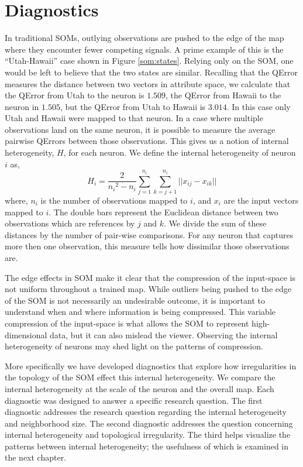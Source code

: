 \section{Diagnostics}
\label{meth:diag}
In traditional SOMs, outlying observations are pushed to the edge of the map
where they encounter fewer competing signals.  A prime example of this is the
``Utah-Hawaii'' case shown in Figure \ref{som:states}.  Relying only on the
SOM, one would be left to believe that the two states are similar.  Recalling
that the QError measures the distance between two vectors in attribute space,
we calculate that the QError from Utah to the neuron is $1.509$, the QError from
Hawaii to the neuron in $1.505$, but the QError from Utah to Hawaii is
$3.014$. In this case only Utah and Hawaii were mapped to that neuron.  In a
case where multiple observations land on the same neuron, it is possible to
measure the average pairwise QErrors between those observations.  This gives us a
notion of internal heterogeneity, \(H\), for each neuron.  We define the
internal heterogeneity of neuron \(i\) as,
 \begin{equation}
   {H_i} = \frac{2}{{n_i}^2-{n_i}}\sum_{j=1}^{n_i}\sum_{k=j+1}^{n_i} ||{x_{ij}}-{x_{ik}}||
 \label{eqno1}
 \end{equation}
where, \(n_i\) is the number of observations mapped to \(i\), and \(x_i\) are
the input vectors mapped to \(i\).   The double bars represent the Euclidean
distance between two observations which are references by \(j\) and \(k\). We
divide the sum of these distances by the number of pair-wise comparisons.
For any neuron that captures more then one observation, this measure tells how
dissimilar those observations are. 

The edge effects in SOM make it clear that the compression of the input-space is
not uniform throughout a trained map.  While outliers being pushed to the edge of
the SOM is not necessarily an undesirable outcome, it is important to understand
when and where information is being compressed.  This variable compression of
the input-space is what allows the SOM to represent high-dimensional data, but
it can also mislead the viewer.  Observing the internal heterogeneity of
neurons may shed light on the patterns of compression.  

More specifically we have developed diagnostics that explore how irregularities
in the topology of the SOM effect this internal heterogeneity.  We compare the
internal heterogeneity at the scale of the neuron and the overall map.  Each
diagnostic was designed to answer a specific research question.  The first
diagnostic addresses the research question regarding the internal
heterogeneity and neighborhood size.  The second diagnostic addresses the
question concerning internal heterogeneity and topological irregularity.  The
third helps visualize the patterns between internal heterogeneity; the
usefulness of which is examined in the next chapter.

